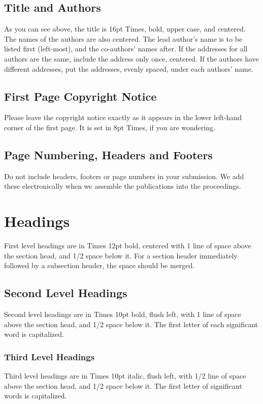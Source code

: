 \documentclass{article}
\begin{document}
\subsection{Title and Authors}
As you can see above, the title is 16pt Times, bold, upper case, and centered.
The names of the authors are also centered.
The lead author's name is to be listed first (left-most), and the co-authors'
names after. If the addresses for all authors are the same, include the
address only once, centered. If the authors have different addresses, put the
addresses, evenly spaced, under each authors' name.

\subsection{First Page Copyright Notice}
Please leave the copyright notice exactly as it appears in the lower
left-hand corner of the first page. It is set in 8pt Times, if you are wondering.

\subsection{Page Numbering, Headers and Footers}
Do not include headers, footers or page numbers in your submission.
We add these electronically when we assemble the publications
into the proceedings.

\section{Headings}
First level headings are in Times 12pt bold,
centered with 1 line of space above the section head, and 1/2 space below it.
For a section header immediately followed by a subsection header, the space
should be merged.

\subsection{Second Level Headings}
Second level headings are in Times 10pt bold, flush left,
with 1 line of space above the section head, and 1/2 space below it.
The first letter of each significant word is capitalized.

\subsubsection{Third Level Headings}
Third level headings are in Times 10pt italic, flush left,
with 1/2 line of space above the section head, and 1/2 space below it.
The first letter of significant words is capitalized.
\end{document}
